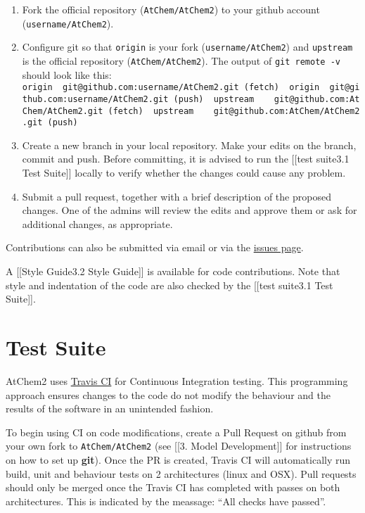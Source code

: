\begin{enumerate}
\def\labelenumi{\arabic{enumi}.}
\item
  Fork the official repository (\texttt{AtChem/AtChem2}) to your github
  account (\texttt{username/AtChem2}).
\item
  Configure git so that \texttt{origin} is your fork
  (\texttt{username/AtChem2}) and \texttt{upstream} is the official
  repository (\texttt{AtChem/AtChem2}). The output of
  \texttt{git\ remote\ -v} should look like this:
  \texttt{origin\ \ git@github.com:username/AtChem2.git\ (fetch)\ \ origin\ \ git@github.com:username/AtChem2.git\ (push)\ \ upstream\ \ \ \ git@github.com:AtChem/AtChem2.git\ (fetch)\ \ upstream\ \ \ \ git@github.com:AtChem/AtChem2.git\ (push)}
\item
  Create a new branch in your local repository. Make your edits on the
  branch, commit and push. Before committing, it is advised to run the
  {[}{[}test suite\textbar{}3.1 Test Suite{]}{]} locally to verify
  whether the changes could cause any problem.
\item
  Submit a pull request, together with a brief description of the
  proposed changes. One of the admins will review the edits and approve
  them or ask for additional changes, as appropriate.
\end{enumerate}

Contributions can also be submitted via email or via the
\href{https://github.com/AtChem/AtChem2/issues}{issues page}.

A {[}{[}Style Guide\textbar{}3.2 Style Guide{]}{]} is available for code
contributions. Note that style and indentation of the code are also
checked by the {[}{[}test suite\textbar{}3.1 Test Suite{]}{]}.

\section{Test Suite} \label{sec:testsuite}

AtChem2 uses \href{https://travis-ci.org/}{Travis CI} for Continuous
Integration testing. This programming approach ensures changes to the
code do not modify the behaviour and the results of the software in an
unintended fashion.

To begin using CI on code modifications, create a Pull Request on github
from your own fork to \texttt{AtChem/AtChem2} (see {[}{[}3. Model
Development{]}{]} for instructions on how to set up \textbf{git}). Once
the PR is created, Travis CI will automatically run build, unit and
behaviour tests on 2 architectures (linux and OSX). Pull requests should
only be merged once the Travis CI has completed with passes on both
architectures. This is indicated by the meassage: ``All checks have
passed''.


